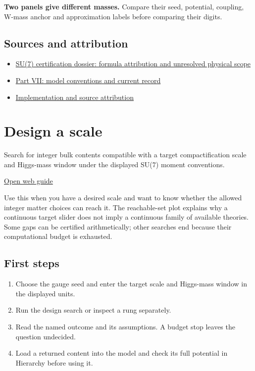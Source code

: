 \documentclass[11pt,a4paper]{article}
\begin{document}
\textbf{Two panels give different masses.} Compare their seed, potential, coupling, W-mass anchor and approximation labels before comparing their digits.

\subsection*{Sources and attribution}
\begin{itemize}
\item \href{https://karlesmarin.github.io/ghu-explorer/docs/su7-certification.html}{SU(7) certification dossier: formula attribution and unresolved physical scope}
\item \href{https://karlesmarin.github.io/ghu-explorer/papers/part-vii/index.html}{Part VII: model conventions and current record}
\item \href{https://github.com/karlesmarin/ghu-lab/blob/main/src/sections/hierarchy_section.js}{Implementation and source attribution}
\end{itemize}
\section{Design a scale}
Search for integer bulk contents compatible with a target compactification scale and Higgs-mass window under the displayed SU(7) moment conventions.

\href{https://karlesmarin.github.io/ghu-explorer/guide/inverse/index.html}{Open web guide}

Use this when you have a desired scale and want to know whether the allowed integer matter choices can reach it. The reachable-set plot explains why a continuous target slider does not imply a continuous family of available theories. Some gaps can be certified arithmetically; other searches end because their computational budget is exhausted.
\subsection*{First steps}
\begin{enumerate}
\item Choose the gauge seed and enter the target scale and Higgs-mass window in the displayed units.
\item Run the design search or inspect a rung separately.
\item Read the named outcome and its assumptions. A budget stop leaves the question undecided.
\item Load a returned content into the model and check its full potential in Hierarchy before using it.
\end{enumerate}
\end{document}
